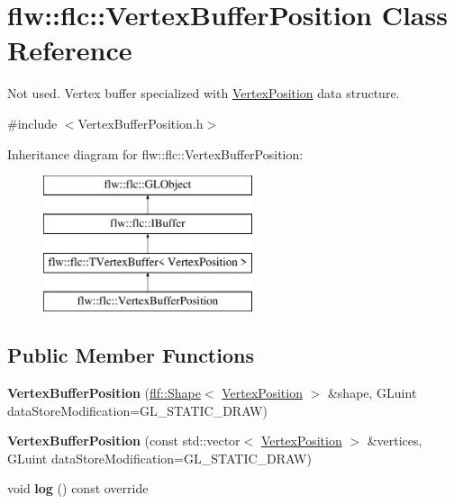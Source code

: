 \hypertarget{classflw_1_1flc_1_1VertexBufferPosition}{}\section{flw\+:\+:flc\+:\+:Vertex\+Buffer\+Position Class Reference}
\label{classflw_1_1flc_1_1VertexBufferPosition}


Not used. Vertex buffer specialized with \hyperlink{structflw_1_1flc_1_1VertexPosition}{Vertex\+Position} data structure.  




{\ttfamily \#include $<$Vertex\+Buffer\+Position.\+h$>$}

Inheritance diagram for flw\+:\+:flc\+:\+:Vertex\+Buffer\+Position\+:\begin{figure}[H]
\begin{center}
\leavevmode
\includegraphics[height=4.000000cm]{classflw_1_1flc_1_1VertexBufferPosition}
\end{center}
\end{figure}
\subsection*{Public Member Functions}
\begin{DoxyCompactItemize}
\item 
\mbox{\label{classflw_1_1flc_1_1VertexBufferPosition_a80e18a764f80682dc6ce996f46fbf53d}} 
{\bfseries Vertex\+Buffer\+Position} (\hyperlink{classflw_1_1flf_1_1Shape}{flf\+::\+Shape}$<$ \hyperlink{structflw_1_1flc_1_1VertexPosition}{Vertex\+Position} $>$ \&shape, G\+Luint data\+Store\+Modification=G\+L\+\_\+\+S\+T\+A\+T\+I\+C\+\_\+\+D\+R\+AW)
\item 
\mbox{\label{classflw_1_1flc_1_1VertexBufferPosition_aa34e4b891964a21e42b94ded3841c3ee}} 
{\bfseries Vertex\+Buffer\+Position} (const std\+::vector$<$ \hyperlink{structflw_1_1flc_1_1VertexPosition}{Vertex\+Position} $>$ \&vertices, G\+Luint data\+Store\+Modification=G\+L\+\_\+\+S\+T\+A\+T\+I\+C\+\_\+\+D\+R\+AW)
\item 
\mbox{\label{classflw_1_1flc_1_1VertexBufferPosition_ac1d3f306fcd045c6418d40849469d585}} 
void {\bfseries log} () const override
\end{DoxyCompactItemize}
